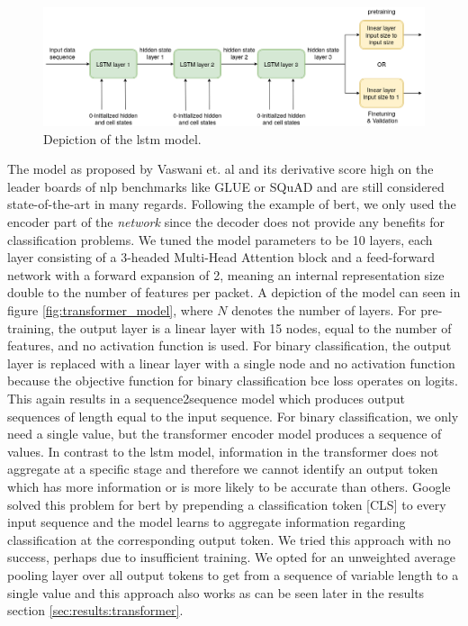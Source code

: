 \begin{figure}[h]
	\centering
	\includegraphics[width=0.95\linewidth]{graphics/img/lstm_model.png}
	\caption{Depiction of the \gls{lstm} model.}
	\label{fig:lstm_model}
\end{figure}

The  model as proposed by Vaswani et. al \cite{attention} and its derivative score high on the leader boards of \gls{nlp} benchmarks like GLUE \cite{glue} or SQuAD \cite{squad} and are still considered state-of-the-art in many regards. Following the example of \gls{bert}, we only used the encoder part of the \textit{network} since the decoder does not provide any benefits for classification problems. We tuned the model parameters to be 10 layers, each layer consisting of a 3-headed Multi-Head Attention block and a feed-forward network with a forward expansion of 2, meaning an internal representation size double to the number of features per packet. A depiction of the model can seen in figure \ref{fig:transformer_model}, where $N$ denotes the number of layers. For pre-training, the output layer is a linear layer with 15 nodes, equal to the number of features, and no activation function is used. For binary classification, the output layer is replaced with a linear layer with a single node and no activation function because the objective function for binary classification \gls{bce} loss operates on logits. This again results in a sequence2sequence model which produces output sequences of length equal to the input sequence. For binary classification, we only need a single value, but the transformer encoder model produces a sequence of values. In contrast to the \gls{lstm} model, information in the transformer does not aggregate at a specific stage and therefore we cannot identify an output token which has more information or is more likely to be accurate than others. Google solved this problem for \gls{bert} by prepending a classification token [CLS] to every input sequence and the model learns to aggregate information regarding classification at the corresponding output token. We tried this approach with no success, perhaps due to insufficient training. We opted for an unweighted average pooling layer over all output tokens to get from a sequence of variable length to a single value and this approach also works as can be seen later in the results section \ref{sec:results:transformer}.

